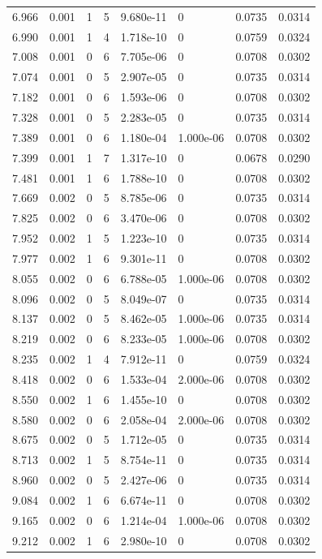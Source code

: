 \documentclass[preview]{standalone}
\begin{document}
{{{\begin{tabular}{L{1.2cm}C{1.2cm} C{0.3cm}C{0.5cm} C{1.4cm}C{1.4cm} C{1.4cm}C{1.4cm}}
  6.966  &  0.001  & 1     &  5 &  9.680e-11  & 0  & 0.0735 &  0.0314   \\ 
  6.990  &  0.001  & 1     &  4 &  1.718e-10  & 0  & 0.0759 &  0.0324   \\ 
  7.008  &  0.001  & 0     &  6 &  7.705e-06  & 0  & 0.0708 &  0.0302   \\ 
  7.074  &  0.001  & 0     &  5 &  2.907e-05  & 0  & 0.0735 &  0.0314   \\ 
  7.182  &  0.001  & 0     &  6 &  1.593e-06  & 0  & 0.0708 &  0.0302   \\ 
  7.328  &  0.001  & 0     &  5 &  2.283e-05  & 0  & 0.0735 &  0.0314   \\ 
  7.389  &  0.001  & 0     &  6 &  1.180e-04  & 1.000e-06  & 0.0708 &  0.0302   \\ 
  7.399  &  0.001  & 1     &  7 &  1.317e-10  & 0  & 0.0678 &  0.0290   \\ 
  7.481  &  0.001  & 1     &  6 &  1.788e-10  & 0  & 0.0708 &  0.0302   \\ 
  7.669  &  0.002  & 0     &  5 &  8.785e-06  & 0  & 0.0735 &  0.0314   \\ 
  7.825  &  0.002  & 0     &  6 &  3.470e-06  & 0  & 0.0708 &  0.0302   \\ 
  7.952  &  0.002  & 1     &  5 &  1.223e-10  & 0  & 0.0735 &  0.0314   \\ 
  7.977  &  0.002  & 1     &  6 &  9.301e-11  & 0  & 0.0708 &  0.0302   \\ 
  8.055  &  0.002  & 0     &  6 &  6.788e-05  & 1.000e-06  & 0.0708 &  0.0302   \\ 
  8.096  &  0.002  & 0     &  5 &  8.049e-07  & 0  & 0.0735 &  0.0314   \\ 
  8.137  &  0.002  & 0     &  5 &  8.462e-05  & 1.000e-06  & 0.0735 &  0.0314   \\ 
  8.219  &  0.002  & 0     &  6 &  8.233e-05  & 1.000e-06  & 0.0708 &  0.0302   \\ 
  8.235  &  0.002  & 1     &  4 &  7.912e-11  & 0  & 0.0759 &  0.0324   \\ 
  8.418  &  0.002  & 0     &  6 &  1.533e-04  & 2.000e-06  & 0.0708 &  0.0302   \\ 
  8.550  &  0.002  & 1     &  6 &  1.455e-10  & 0  & 0.0708 &  0.0302   \\ 
  8.580  &  0.002  & 0     &  6 &  2.058e-04  & 2.000e-06  & 0.0708 &  0.0302   \\ 
  8.675  &  0.002  & 0     &  5 &  1.712e-05  & 0  & 0.0735 &  0.0314   \\ 
  8.713  &  0.002  & 1     &  5 &  8.754e-11  & 0  & 0.0735 &  0.0314   \\ 
  8.960  &  0.002  & 0     &  5 &  2.427e-06  & 0  & 0.0735 &  0.0314   \\ 
  9.084  &  0.002  & 1     &  6 &  6.674e-11  & 0  & 0.0708 &  0.0302   \\ 
  9.165  &  0.002  & 0     &  6 &  1.214e-04  & 1.000e-06  & 0.0708 &  0.0302   \\ 
  9.212  &  0.002  & 1     &  6 &  2.980e-10  & 0  & 0.0708 &  0.0302   \\ 
\hline 
\end{tabular} 

}}}
\end{document}
